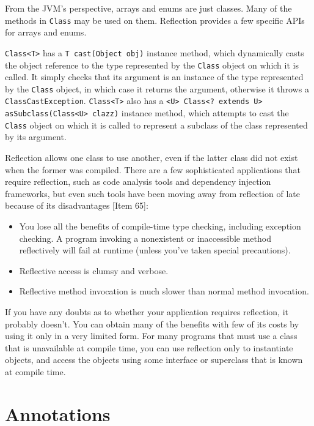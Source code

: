 \documentclass[8pt, table, xcdraw]{article}%
\begin{document}
From the JVM's perspective, arrays and enums are just classes. Many of the methods in \lstinline{Class} may be used on them. Reflection provides a few specific APIs for arrays and enums.

\lstinline{Class<T>} has a \lstinline{T cast(Object obj)} instance method, which dynamically casts the object reference to the type represented by the \lstinline{Class} object on which it is called. It simply checks that its argument is an instance of the type represented by the \lstinline{Class} object, in which case it returns the argument, otherwise it throws a \lstinline{ClassCastException}. \lstinline{Class<T>} also has a \lstinline{<U> Class<? extends U> asSubclass(Class<U> clazz)} instance method, which attempts to cast the \lstinline{Class} object on which it is called to represent a subclass of the class represented by its argument.

Reflection allows one class to use another, even if the latter class did not exist when the former was compiled. There are a few sophisticated applications that require reflection, such as code analysis tools and dependency injection frameworks, but even such tools
have been moving away from reflection of late because of its disadvantages [Item 65]:

\begin{itemize}
    \item You lose all the benefits of compile-time type checking, including exception checking. A program invoking a nonexistent or inaccessible method reflectively will fail at runtime (unless you’ve taken special precautions).
    \item Reflective access is clumsy and verbose.
    \item Reflective method invocation is much slower than normal method invocation.
\end{itemize}

If you have any doubts as to whether your application requires reflection, it probably doesn’t. You can obtain many of the benefits with few of its costs by using it only in a very limited form. For many programs that must use a class that is unavailable at compile time, you can use reflection only to instantiate objects, and access the objects using some interface or superclass that is known at compile time.

\section{Annotations}
\end{document}
